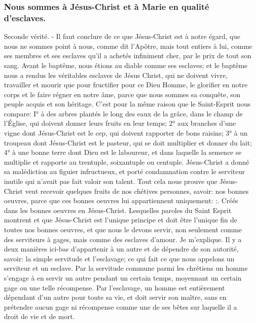 \subsubsection{Nous sommes à Jésus-Christ et à Marie en qualité d'esclaves.}
 Seconde vérité. - Il faut conclure de ce que Jésus-Christ est à notre égard, que nous ne sommes point à nous,
comme dit l'Apôtre, mais tout entiers à lui, comme ses membres et ses esclaves qu'il a achetés infiniment cher, par
le prix de tout son sang. Avant le baptême, nous étions au diable comme ses esclaves; et le baptême nous a
rendus les véritables esclaves de Jésus Christ, qui ne doivent vivre, travailler et mourir que pour fructifier pour ce
Dieu Homme, le glorifier en notre corps et le faire régner en notre âme, parce que nous sommes sa conquête, son
peuple acquis et son héritage. C'est pour la même raison que le Saint-Esprit nous compare: I° à des arbres plantés
le long des eaux de la grâce, dans le champ de l'Église, qui doivent donner leurs fruits en leur temps; 2° aux
branches d'une vigne dont Jésus-Christ est le cep, qui doivent rapporter de bons raisins; 3° à un troupeau dont
Jésus-Christ est le pasteur, qui se doit multiplier et donner du lait; 4° à une bonne terre dont Dieu est le laboureur,
et dans laquelle la semence se multiplie et rapporte au trentuple, soixantuple ou centuple. Jésus-Christ a donné sa
malédiction au figuier infructueux, et porté condamnation contre le serviteur inutile qui n'avait pas fait valoir son
talent. Tout cela nous prouve que Jésus-Christ veut recevoir quelques fruits de nos chétives personnes, savoir:
nos bonnes oeuvres, parce que ces bonnes oeuvres lui appartiennent uniquement: :. Créés dans les bonnes oeuvres en Jésus-Christ. Lesquelles paroles du Saint Esprit montrent et que
Jésus-Christ est l'unique principe et doit être l'unique fin de toutes nos bonnes oeuvres, et que nous le devons
servir, non seulement comme des serviteurs à gages, mais comme des esclaves d'amour. Je m'explique.
 Il y a deux manières ici-bas d'appartenir à un autre et de dépendre de son autorité, savoir: la simple servitude
et l'esclavage; ce qui fait ce que nous appelons un serviteur et un esclave.
Par la servitude commune parmi les chrétiens un homme s'engage à en servir un autre pendant un certain temps,
moyennant un certain gage ou une telle récompense.
Par l'esclavage, un homme est entièrement dépendant d'un autre pour toute sa vie, et doit servir son maître, sans
en prétendre aucun gage ni récompense comme une de ses bêtes sur laquelle il a droit de vie et de mort.
